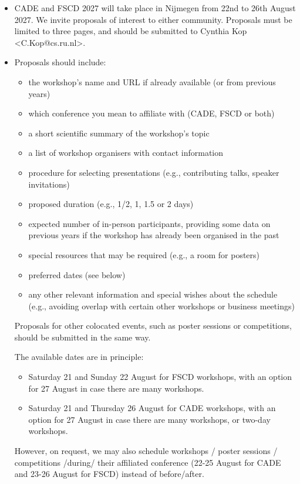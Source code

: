 \documentclass[prodmode,acmtecs]{acmsmall} %
\begin{document}
\begin{itemize}\item  CADE and FSCD 2027 will take place in Nijmegen from 22nd to 26th August 2027. We invite proposals of interest to either community.  Proposals must be limited to three pages, and should be submitted to Cynthia Kop <C.Kop@cs.ru.nl>. 
 
\item  Proposals should include: 
 
\begin{itemize}\item  the workshop's name and URL if already available (or from previous years)
\item  which conference you mean to affiliate with (CADE, FSCD or both)
\item  a short scientific summary of the workshop's topic
\item  a list of workshop organisers with contact information
\item  procedure for selecting presentations (e.g., contributing talks, speaker invitations)
\item  proposed duration (e.g., 1/2, 1, 1.5 or 2 days)
\item  expected number of in-person participants, providing some data on previous years if the workshop has already been organised in the past
\item  special resources that may be required (e.g., a room for posters)
\item  preferred dates (see below)
\item  any other relevant information and special wishes about the schedule (e.g., avoiding overlap with certain other workshops or business meetings)
\end{itemize} 
  Proposals for other colocated events, such as poster sessions or competitions, should be submitted in the same way. 
 
  The available dates are in principle: 
 
\begin{itemize}\item  Saturday 21 and Sunday 22 August for FSCD workshops, with an option for 27 August in case there are many workshops.
\item   Saturday 21 and Thursday 26 August for CADE workshops, with an option for 27 August in case there are many workshops, or two-day workshops.
\end{itemize} 
  However, on request, we may also schedule workshops / poster sessions / competitions /during/ their affiliated conference (22-25 August for CADE and 23-26 August for FSCD) instead of before/after. 
 

\end{itemize}
\end{document}
